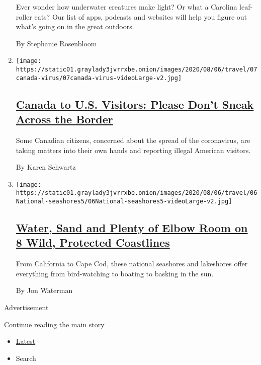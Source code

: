 \begin{enumerate}
  Ever wonder how underwater creatures make light? Or what a Carolina
  leaf-roller eats? Our list of apps, podcasts and websites will help
  you figure out what's going on in the great outdoors.

  By Stephanie Rosenbloom
\item
  \texttt{[image: https://static01.graylady3jvrrxbe.onion/images/2020/08/06/travel/07canada-virus/07canada-virus-videoLarge-v2.jpg]}

  \hypertarget{canada-to-us-visitors-please-dont-sneak-across-the-border}{%
  \subsection{\texorpdfstring{\href{/2020/08/07/travel/Canada-border-crossings-coronavirus.html}{Canada
  to U.S. Visitors: Please Don't Sneak Across the
  Border}}{Canada to U.S. Visitors: Please Don't Sneak Across the Border}}\label{canada-to-us-visitors-please-dont-sneak-across-the-border}}

  Some Canadian citizens, concerned about the spread of the coronavirus,
  are taking matters into their own hands and reporting illegal American
  visitors.

  By Karen Schwartz
\item
  \texttt{[image: https://static01.graylady3jvrrxbe.onion/images/2020/08/06/travel/06National-seashores5/06National-seashores5-videoLarge-v2.jpg]}

  \hypertarget{water-sand-and-plenty-of-elbow-room-on-8-wild-protected-coastlines}{%
  \subsection{\texorpdfstring{\href{/2020/08/06/travel/National-Seashores.html}{Water,
  Sand and Plenty of Elbow Room on 8 Wild, Protected
  Coastlines}}{Water, Sand and Plenty of Elbow Room on 8 Wild, Protected Coastlines}}\label{water-sand-and-plenty-of-elbow-room-on-8-wild-protected-coastlines}}

  From California to Cape Cod, these national seashores and lakeshores
  offer everything from bird-watching to boating to basking in the sun.

  By Jon Waterman
\end{enumerate}

Advertisement

\protect\hyperlink{after-mid1}{Continue reading the main story}

\begin{itemize}
\tightlist
\item
  \protect\hyperlink{stream-panel}{Latest}
\item
  Search
\end{itemize}

